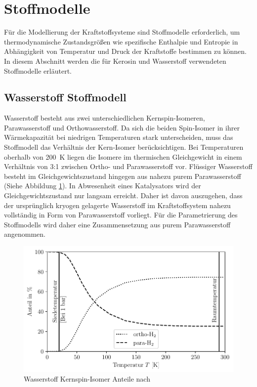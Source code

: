 \section{Stoffmodelle}

Für die Modellierung der Kraftstoffsysteme sind Stoffmodelle erforderlich, um thermodynamische Zustandsgrößen wie spezifische Enthalpie und Entropie in Abhängigkeit von Temperatur und Druck der Kraftstoffe bestimmen zu können. In diesem Abschnitt werden die für Kerosin und Wasserstoff verwendeten Stoffmodelle erläutert.

\subsection{Wasserstoff Stoffmodell}

Wasserstoff besteht aus zwei unterschiedlichen Kernspin-Isomeren, Parawasserstoff und Orthowasserstoff. Da sich die beiden Spin-Isomer in ihrer Wärmekapazität bei niedrigen Temperaturen stark unterscheiden, muss das Stoffmodell das Verhältnis der Kern-Isomer berücksichtigen. Bei Temperaturen oberhalb von \SI{200}{\K} liegen die Isomere im thermischen Gleichgewicht in einem Verhältnis von 3:1 zwischen Ortho- und Parawasserstoff vor. Flüssiger Wasserstoff besteht im Gleichgewichtszustand hingegen aus nahezu purem Parawasserstoff (Siehe Abbildung \ref{fig:spin}). In Abwesenheit eines Katalysators wird der Gleichgewichtszustand nur langsam erreicht. Daher ist davon auszugehen, dass der ursprünglich kryogen gelagerte Wasserstoff im Kraftstoffsystem nahezu vollständig in Form von Parawasserstoff vorliegt. Für die Parametrierung des Stoffmodells wird daher eine Zusammensetzung aus purem Parawasserstoff angenommen. \cite{Buntkowsky.2022}

\begin{figure}[ht]
\centering
\includegraphics[width=1\linewidth]{4_Abbildungen/2_Hauptteil/spin.pdf}
  \caption{Wasserstoff Kernspin-Isomer Anteile nach \cite{Buntkowsky.2022}}
  \label{fig:spin}
\end{figure}
\FloatBarrier 

